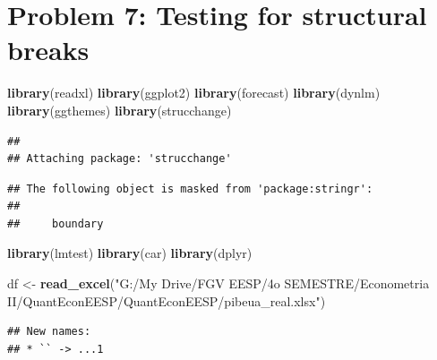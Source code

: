 \documentclass[11pt, a4paper]{report}
\newenvironment{Shaded}{\begin{snugshade}}{\end{snugshade}}
\newcommand{\CommentTok}[1]{\textcolor[rgb]{0.56,0.35,0.01}{\textit{#1}}}
\newcommand{\DataTypeTok}[1]{\textcolor[rgb]{0.13,0.29,0.53}{#1}}
\newcommand{\DecValTok}[1]{\textcolor[rgb]{0.00,0.00,0.81}{#1}}
\newcommand{\KeywordTok}[1]{\textcolor[rgb]{0.13,0.29,0.53}{\textbf{#1}}}
\newcommand{\NormalTok}[1]{#1}
\newcommand{\OperatorTok}[1]{\textcolor[rgb]{0.81,0.36,0.00}{\textbf{#1}}}
\newcommand{\StringTok}[1]{\textcolor[rgb]{0.31,0.60,0.02}{#1}}
\theoremstyle{plain}
\theoremstyle{plain}
\theoremstyle{remark}
\begin{document}
\chapter{Problem 7: Testing for structural breaks}

\begin{Shaded}
\begin{Highlighting}[]
\KeywordTok{library}\NormalTok{(readxl)}
\KeywordTok{library}\NormalTok{(ggplot2)}
\KeywordTok{library}\NormalTok{(forecast)}
\KeywordTok{library}\NormalTok{(dynlm)}
\KeywordTok{library}\NormalTok{(ggthemes)}
\KeywordTok{library}\NormalTok{(strucchange)}
\end{Highlighting}
\end{Shaded}

\begin{verbatim}
## 
## Attaching package: 'strucchange'
\end{verbatim}

\begin{verbatim}
## The following object is masked from 'package:stringr':
## 
##     boundary
\end{verbatim}

\begin{Shaded}
\begin{Highlighting}[]
\KeywordTok{library}\NormalTok{(lmtest)}
\KeywordTok{library}\NormalTok{(car)}
\KeywordTok{library}\NormalTok{(dplyr)}

\NormalTok{df <-}\StringTok{ }\KeywordTok{read_excel}\NormalTok{(}\StringTok{"G:/My Drive/FGV EESP/4o SEMESTRE/Econometria II/QuantEconEESP/QuantEconEESP/pibeua_real.xlsx"}\NormalTok{)}
\end{Highlighting}
\end{Shaded}

\begin{verbatim}
## New names:
## * `` -> ...1
\end{verbatim}

\begin{Shaded}
\end{Shaded}
\end{document}
